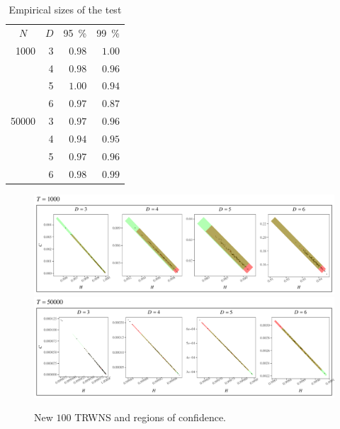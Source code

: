 \documentclass[alpha-refs]{wiley-article}
\begin{document}
\begin{table}[hbt]
	\centering
	\caption{Empirical sizes of the test}
	\label{tab:result1}
	\begin{tabular}{*{3}rr}
		\toprule
		\multicolumn{1}{c}{$N$} & \multicolumn{1}{c}{$D$} & \multicolumn{1}{c}{\SI{95}{\percent}} & \multicolumn{1}{c}{\SI{99}{\percent}}\\
		\cmidrule(lr){1-1}
		\cmidrule(lr){2-2}
		\cmidrule(lr){3-3}
		\cmidrule(lr){4-4}
		1000 & 3 & $0.98$ & $1.00$\\
		& 4 & $0.98$ & $0.96$\\
		& 5 & $1.00$ & $0.94$\\
		& 6 & $0.97$ & $0.87$\\
		\cmidrule(lr){1-4} 
		50000 & 3 & $0.97$ & $0.96$\\
		& 4 & $0.94$ & $0.95$\\
		& 5 & $0.97$ & $0.96$\\ 
		& 6 & $0.98$ & $0.99$\\ 
		\bottomrule
	\end{tabular}
\end{table}

\begin{figure}[hbt]
	\centering
	\includegraphics[width=\linewidth]{Figures/RNG-1000.pdf}
	\includegraphics[width=\linewidth]{Figures/RNG-50000.pdf}
	\caption{New $100$ TRWNS and regions of confidence.}
	\label{fig:RNG}
\end{figure}
\end{document}
